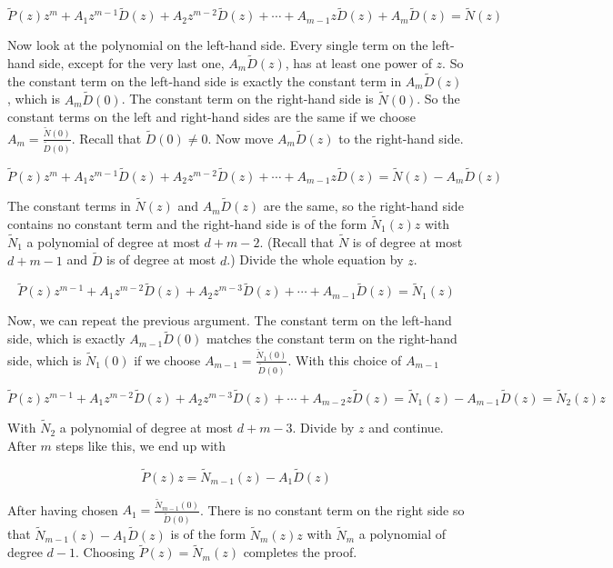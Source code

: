 \[
    \tilde{P}(z)z^m + A_1 z^{m-1} \tilde{D}(z) + A_2 z^{m-2} \tilde{D}(z) + \cdots + A_{m-1} z \tilde{D}(z) + A_m \tilde{D}(z) = \tilde{N}(z)
\]

Now look at the polynomial on the left-hand side. Every single term on the left-hand side,
except for the very last one, \(A_m \tilde{D}(z)\), has at least one power of \(z\). So the constant term on
the left-hand side is exactly the constant term in \(A_m \tilde{D}(z)\), which is \(A_m \tilde{D}(0)\). The constant
term on the right-hand side is \(\tilde{N}(0)\). So the constant terms on the left and right-hand sides
are the same if we choose \(A_m = \frac{\tilde{N}(0)}{\tilde{D}(0)}\). Recall that \(\tilde{D}(0) \neq 0\). 
Now move \(A_m \tilde{D}(z)\) to the right-hand side.

\[
    \tilde{P}(z)z^m + A_1 z^{m-1} \tilde{D}(z) + A_2 z^{m-2} \tilde{D}(z) + \cdots + A_{m-1} z \tilde{D}(z) = \tilde{N}(z) - A_m \tilde{D}(z)
\]

The constant terms in \(\tilde{N}(z)\) and \(A_m \tilde{D}(z)\) are the same, so the right-hand side contains no
constant term and the right-hand side is of the form \(\tilde{N}_1(z)z\) with \(\tilde{N}_1\) a polynomial of degree
at most \(d + m - 2\). (Recall that \(\tilde{N}\) is of degree at most \(d + m - 1\) and \(\tilde{D}\) is of degree at most
\(d\).) Divide the whole equation by \(z\).

\[
    \tilde{P}(z)z^{m-1} + A_1 z^{m-2} \tilde{D}(z) + A_2 z^{m-3} \tilde{D}(z) + \cdots + A_{m-1} \tilde{D}(z) = \tilde{N}_1(z)
\]

Now, we can repeat the previous argument. The constant term on the left-hand side, which
is exactly \(A_{m-1} \tilde{D}(0)\) matches the constant term on the right-hand side, which is \(\tilde{N}_1(0)\) if we
choose \(A_{m-1} = \frac{\tilde{N}_1(0)}{\tilde{D}(0)}\). With this choice of \(A_{m-1}\)

\[
    \tilde{P}(z)z^{m-1} + A_1 z^{m-2} \tilde{D}(z) + A_2 z^{m-3} \tilde{D}(z) + \cdots + A_{m-2} z \tilde{D}(z) = \tilde{N}_1(z) - A_{m-1} \tilde{D}(z) = \tilde{N}_2(z)z
\]

With \(\tilde{N}_2\) a polynomial of degree at most \(d + m - 3\). Divide by \(z\) and continue. After \(m\) steps
like this, we end up with

\[
    \tilde{P}(z)z = \tilde{N}_{m-1}(z) - A_1 \tilde{D}(z)
\]

After having chosen \(A_1 = \frac{\tilde{N}_{m-1}(0)}{\tilde{D}(0)}\). There is no constant term on the right side so that
\(\tilde{N}_{m-1}(z) - A_1 \tilde{D}(z)\) is of the form \(\tilde{N}_m(z)z\) with \(\tilde{N}_m\) a polynomial of degree \(d - 1\). Choosing
\(\tilde{P}(z) = \tilde{N}_m(z)\) completes the proof.

